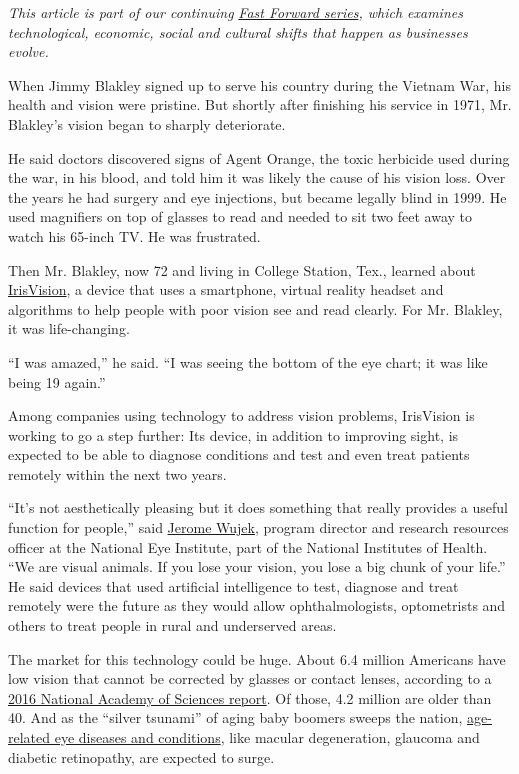 \emph{This article is part of our continuing}
\href{https://www.nytimes3xbfgragh.onion/spotlight/fast-forward}{\emph{Fast
Forward series}}\emph{, which examines technological, economic, social
and cultural shifts that happen as businesses evolve.}

When Jimmy Blakley signed up to serve his country during the Vietnam
War, his health and vision were pristine. But shortly after finishing
his service in 1971, Mr. Blakley's vision began to sharply deteriorate.

He said doctors discovered signs of Agent Orange, the toxic herbicide
used during the war, in his blood, and told him it was likely the cause
of his vision loss. Over the years he had surgery and eye injections,
but became legally blind in 1999. He used magnifiers on top of glasses
to read and needed to sit two feet away to watch his 65-inch TV. He was
frustrated.

Then Mr. Blakley, now 72 and living in College Station, Tex., learned
about \href{https://irisvision.com/}{IrisVision}, a device that uses a
smartphone, virtual reality headset and algorithms to help people with
poor vision see and read clearly. For Mr. Blakley, it was life-changing.

``I was amazed,'' he said. ``I was seeing the bottom of the eye chart;
it was like being 19 again.''

Among companies using technology to address vision problems, IrisVision
is working to go a step further: Its device, in addition to improving
sight, is expected to be able to diagnose conditions and test and even
treat patients remotely within the next two years.

``It's not aesthetically pleasing but it does something that really
provides a useful function for people,'' said
\href{https://www.nei.nih.gov/about/news-and-events/press-contacts-and-spokespeople/jerome-r-wujek-phd}{Jerome
Wujek}, program director and research resources officer at the National
Eye Institute, part of the National Institutes of Health. ``We are
visual animals. If you lose your vision, you lose a big chunk of your
life.'' He said devices that used artificial intelligence to test,
diagnose and treat remotely were the future as they would allow
ophthalmologists, optometrists and others to treat people in rural and
underserved areas.

The market for this technology could be huge. About 6.4 million
Americans have low vision that cannot be corrected by glasses or contact
lenses, according to a
\href{https://pubmed.ncbi.nlm.nih.gov/27656731/}{2016 National Academy
of Sciences report}. Of those, 4.2 million are older than 40. And as the
``silver tsunami'' of aging baby boomers sweeps the nation,
\href{https://www.afb.org/research-and-initiatives/statistics/statistics-seniors-vision-loss}{age-related
eye diseases and conditions}, like macular degeneration, glaucoma and
diabetic retinopathy, are expected to surge.

